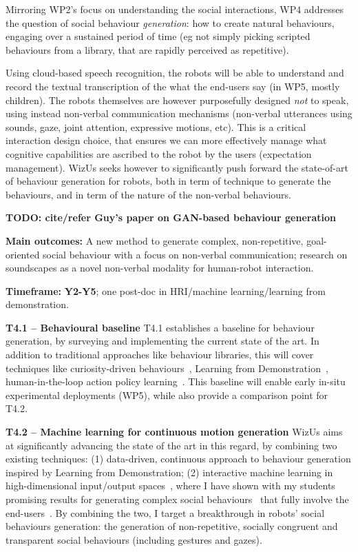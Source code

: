 \documentclass[11pt,a4paper]{report}
\newcommand{\project}{WizUs\xspace}
\newcommand{\TODO}[1]{{\color{red}\textbf{TODO: #1}}}
\begin{document}
Mirroring WP2's focus on understanding the social interactions, WP4 addresses the
question of social behaviour \emph{generation}: how to create natural
behaviours, engaging over a sustained period of time (eg not simply picking
scripted behaviours from a library, that are rapidly perceived as repetitive).

Using cloud-based speech recognition, the robots will be able to understand and
record the textual transcription of the what the end-users say (in WP5, mostly
children). The robots themselves are however purposefully designed \emph{not} to
speak, using instead non-verbal communication mechanisms (non-verbal utterances
using sounds, gaze, joint attention, expressive motions, etc). This is a
critical interaction design choice, that ensures we can more effectively manage
what cognitive capabilities are ascribed to the robot by the users (expectation
management).  \project seeks however to significantly push forward the
state-of-art of behaviour generation for robots, both in term of technique to
generate the behaviours, and in term of the nature of the non-verbal behaviours.

\TODO{cite/refer Guy's paper on GAN-based behaviour generation}

\begin{framed}

    \textbf{Main outcomes:} A new method to generate complex, non-repetitive,
    goal-oriented social behaviour with a focus on non-verbal communication;
    research on soundscapes as a novel non-verbal modality for human-robot
    interaction.

    \textbf{Timeframe:} \textbf{Y2-Y5}; one post-doc in HRI/machine learning/learning from
demonstration.

\end{framed}


\textbf{T4.1 -- Behavioural baseline} T4.1 establishes a baseline for behaviour
generation, by surveying and implementing the current state of the art. In
addition to traditional approaches like behaviour libraries, this will cover
techniques like curiosity-driven behaviours~\cite{oudeyer2005playground},
Learning from Demonstration~\cite{billard2008robot, argall2009survey},
human-in-the-loop action policy learning~\cite{senft2016sparc,
senft2019teaching}. This baseline will enable early in-situ experimental
deployments (WP5), while also provide a comparison point for T4.2.

\textbf{T4.2 -- Machine learning for continuous motion generation} \project aims
at significantly advancing the state of the art in this regard, by combining two
existing techniques: (1) data-driven, continuous approach to behaviour
generation inspired by Learning from Demonstration; (2) interactive machine
learning in high-dimensional input/output spaces~\cite{senft2020woz}, where I
have shown with my students promising results for generating complex social
behaviours~\cite{senft2019teaching, winkle2020couch} that fully involve the
end-users~\cite{winkle2018social}.  By combining the two, I target
a breakthrough in robots' social behaviours generation: the generation of
non-repetitive, socially congruent and transparent social behaviours (including
gestures and gazes).
\end{document}
